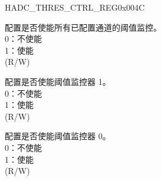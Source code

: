 \begin{register}{H}{ADC\_THRES\_CTRL\_REG}{0x004C}\label{regdesc:ADCTHRESCTRLREG}
%
%
%
%
%
\regnewline%
\begin{regdesc}\begin{reglist}
\label{fielddesc:ADCTHRESALLEN}\item [ADC\_THRES\_ALL\_EN] 配置是否使能所有已配置通道的阈值监控。\\
0：不使能\\
1：使能\\
(R/W)
\label{fielddesc:ADCTHRES1EN}\item [ADC\_THRES1\_EN] 配置是否使能阈值监控器 1。\\
0：不使能\\
1：使能\\
(R/W)
\label{fielddesc:ADCTHRES0EN}\item [ADC\_THRES0\_EN] 配置是否使能阈值监控器 0。\\
0：不使能\\
1：使能\\
(R/W)
\end{reglist}\end{regdesc}
\end{register}


